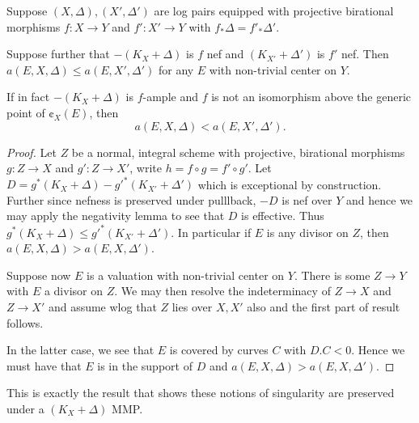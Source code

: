\begin{lemma}\label{l:increase-discr}
	Suppose $(X,\Delta),(X',\Delta')$ are log pairs equipped with projective birational morphisms $f\colon X \to Y$ and $f':X'\to Y$ with $f_{*}\Delta=f'_{*}\Delta'$.
	
	Suppose further that $-(K_{X}+\Delta)$ is $f$ nef and $(K_{X'}+\Delta')$ is $f'$ nef. Then $a(E,X,\Delta) \leq a(E,X',\Delta')$ for any $E$ with non-trivial center on $Y$.
	
	If in fact $-(K_X+\Delta)$ is $f$-ample and $f$ is not an isomorphism above the generic point of $\cent_X(E)$, then
	$$ a(E, X, \Delta ) < a(E, X', \Delta').$$
\end{lemma}
\begin{proof}
	Let $Z$ be a normal, integral scheme with projective, birational morphisms $g\colon Z \to X$ and $g':Z \to X'$, write $h=f \circ g=f' \circ g'$. Let $D= g^{*}(K_{X}+\Delta)-g'^{*}(K_{X'}+\Delta')$ which is exceptional by construction. Further since nefness is preserved under pulllback, $-D$ is nef over $Y$ and hence we may apply the negativity lemma to see that $D$ is effective. Thus $g^{*}(K_{X}+\Delta) \leq g'^{*}(K_{X'}+\Delta')$. In particular if $E$ is any divisor on $Z$, then $a(E,X,\Delta) > a(E,X,\Delta')$.
	
	Suppose now $E$ is a valuation with non-trivial center on $Y$. There is some $Z \to Y$ with $E$ a divisor on $Z$. We may then resolve the indeterminacy of $Z \to X$ and $Z \to X'$ and assume wlog that $Z$ lies over $X,X'$ also and the first part of result follows.
	
	In the latter case, we see that $E$ is covered by curves $C$ with $D.C <0$. Hence we must have that $E$ is in the support of $D$ and $a(E,X,\Delta) > a(E,X,\Delta')$.
\end{proof}

This is exactly the result that shows these notions of singularity are preserved under a $(K_{X}+\Delta)$ MMP.


